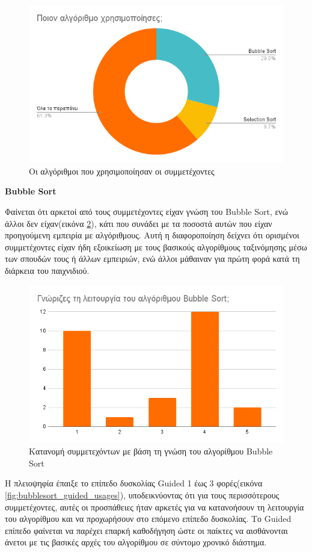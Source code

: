 \begin{figure}[H]
    \centering
    \includegraphics[width=0.7\linewidth]{sections/5/2/images/what_algorithm_did_you_use}
    \caption{Οι αλγόριθμοι που χρησιμοποίησαν οι συμμετέχοντες}
    \label{fig:what_algorithm_did_you_use}
\end{figure}

\textbf{Bubble Sort}

Φαίνεται ότι αρκετοί από τους συμμετέχοντες είχαν γνώση του Bubble Sort, ενώ άλλοι δεν είχαν(εικόνα \ref{fig:did_you_know_the_functionality_of_bubblesort}), κάτι που συνάδει με τα ποσοστά αυτών που είχαν προηγούμενη εμπειρία με αλγόριθμους. Αυτή η διαφοροποίηση δείχνει ότι ορισμένοι συμμετέχοντες είχαν ήδη εξοικείωση με τους βασικούς αλγορίθμους ταξινόμησης μέσω των σπουδών τους ή άλλων εμπειριών, ενώ άλλοι μάθαιναν για πρώτη φορά κατά τη διάρκεια του παιχνιδιού.

\begin{figure}[H]
    \centering
    \includegraphics[width=0.7\linewidth]{sections/5/2/images/did_you_know_the_functionality_of_bubblesort}
    \caption{Κατανομή συμμετεχόντων με βάση τη γνώση του αλγορίθμου Bubble Sort}
    \label{fig:did_you_know_the_functionality_of_bubblesort}
\end{figure}

Η πλειοψηφία έπαιξε το επίπεδο δυσκολίας Guided 1 έως 3 φορές(εικόνα \ref{fig:bubblesort_guided_usages}), υποδεικνύοντας ότι για τους περισσότερους συμμετέχοντες, αυτές οι προσπάθειες ήταν αρκετές για να κατανοήσουν τη λειτουργία του αλγορίθμου και να προχωρήσουν στο επόμενο επίπεδο δυσκολίας. Το Guided επίπεδο φαίνεται να παρέχει επαρκή καθοδήγηση ώστε οι παίκτες να αισθάνονται άνετοι με τις βασικές αρχές του αλγορίθμου σε σύντομο χρονικό διάστημα.

